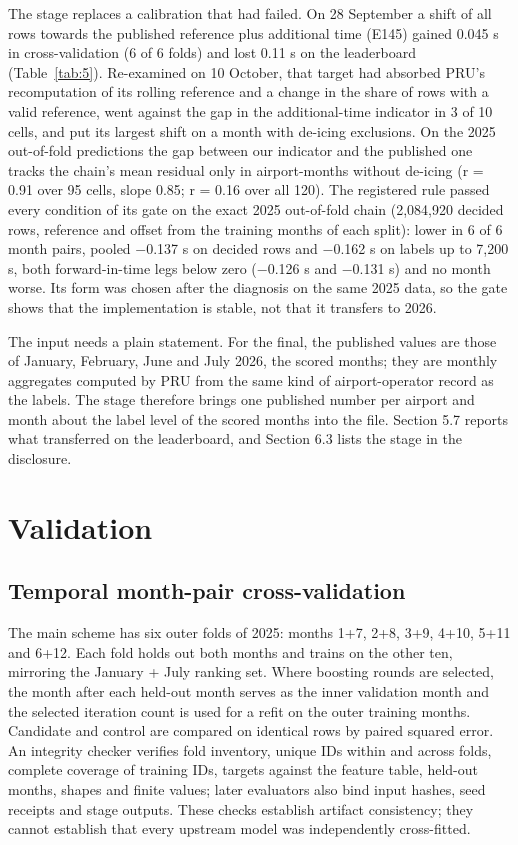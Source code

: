 \documentclass[
  manuscript=article,  %
  layout=preprint,     %
  year=2026,
  volume=4,
]{extra/joas}
\begin{document}
The stage replaces a calibration that had failed. On 28 September a shift of all rows towards the published reference plus additional time (E145) gained 0.045 s in cross-validation (6 of 6 folds) and lost 0.11 s on the leaderboard (Table~\ref{tab:5}). Re-examined on 10 October, that target had absorbed PRU's recomputation of its rolling reference and a change in the share of rows with a valid reference, went against the gap in the additional-time indicator in 3 of 10 cells, and put its largest shift on a month with de-icing exclusions. On the 2025 out-of-fold predictions the gap between our indicator and the published one tracks the chain's mean residual only in airport-months without de-icing (r = 0.91 over 95 cells, slope 0.85; r = 0.16 over all 120). The registered rule passed every condition of its gate on the exact 2025 out-of-fold chain (2,084,920 decided rows, reference and offset from the training months of each split): lower in 6 of 6 month pairs, pooled $-$0.137 s on decided rows and $-$0.162 s on labels up to 7,200 s, both forward-in-time legs below zero ($-$0.126 s and $-$0.131 s) and no month worse. Its form was chosen after the diagnosis on the same 2025 data, so the gate shows that the implementation is stable, not that it transfers to 2026.

The input needs a plain statement. For the final, the published values are those of January, February, June and July 2026, the scored months; they are monthly aggregates computed by PRU from the same kind of airport-operator record as the labels. The stage therefore brings one published number per airport and month about the label level of the scored months into the file. Section 5.7 reports what transferred on the leaderboard, and Section 6.3 lists the stage in the disclosure.

\section{Validation}\label{validation}

\subsection{Temporal month-pair cross-validation}\label{temporal-month-pair-cross-validation}

The main scheme has six outer folds of 2025: months 1+7, 2+8, 3+9, 4+10, 5+11 and 6+12. Each fold holds out both months and trains on the other ten, mirroring the January + July ranking set. Where boosting rounds are selected, the month after each held-out month serves as the inner validation month and the selected iteration count is used for a refit on the outer training months. Candidate and control are compared on identical rows by paired squared error. An integrity checker verifies fold inventory, unique IDs within and across folds, complete coverage of training IDs, targets against the feature table, held-out months, shapes and finite values; later evaluators also bind input hashes, seed receipts and stage outputs. These checks establish artifact consistency; they cannot establish that every upstream model was independently cross-fitted.
\end{document}
